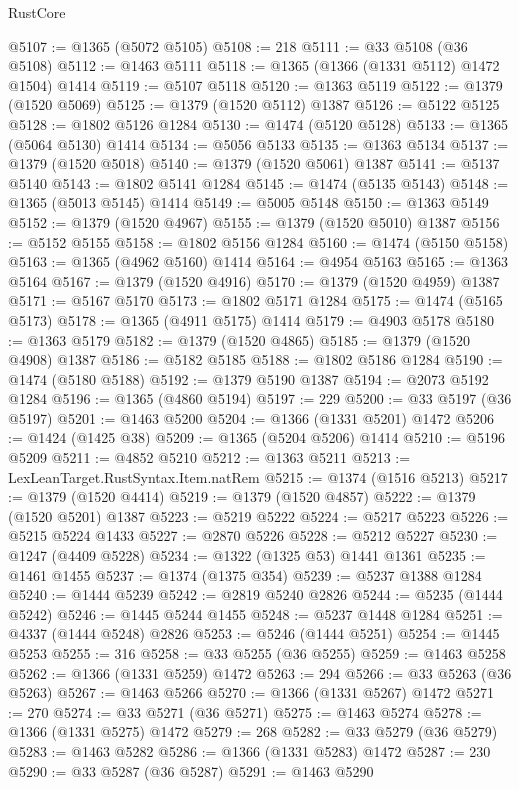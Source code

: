\begin{lexlean}{RustCore}
\begin{coremodule}
@5107 := @1365 (@5072 @5105)
@5108 := 218
@5111 := @33 @5108 (@36 @5108)
@5112 := @1463 @5111
@5118 := @1365 (@1366 (@1331 @5112) @1472 @1504) @1414
@5119 := @5107 @5118
@5120 := @1363 @5119
@5122 := @1379 (@1520 @5069)
@5125 := @1379 (@1520 @5112) @1387
@5126 := @5122 @5125
@5128 := @1802 @5126 @1284
@5130 := @1474 (@5120 @5128)
@5133 := @1365 (@5064 @5130) @1414
@5134 := @5056 @5133
@5135 := @1363 @5134
@5137 := @1379 (@1520 @5018)
@5140 := @1379 (@1520 @5061) @1387
@5141 := @5137 @5140
@5143 := @1802 @5141 @1284
@5145 := @1474 (@5135 @5143)
@5148 := @1365 (@5013 @5145) @1414
@5149 := @5005 @5148
@5150 := @1363 @5149
@5152 := @1379 (@1520 @4967)
@5155 := @1379 (@1520 @5010) @1387
@5156 := @5152 @5155
@5158 := @1802 @5156 @1284
@5160 := @1474 (@5150 @5158)
@5163 := @1365 (@4962 @5160) @1414
@5164 := @4954 @5163
@5165 := @1363 @5164
@5167 := @1379 (@1520 @4916)
@5170 := @1379 (@1520 @4959) @1387
@5171 := @5167 @5170
@5173 := @1802 @5171 @1284
@5175 := @1474 (@5165 @5173)
@5178 := @1365 (@4911 @5175) @1414
@5179 := @4903 @5178
@5180 := @1363 @5179
@5182 := @1379 (@1520 @4865)
@5185 := @1379 (@1520 @4908) @1387
@5186 := @5182 @5185
@5188 := @1802 @5186 @1284
@5190 := @1474 (@5180 @5188)
@5192 := @1379 @5190 @1387
@5194 := @2073 @5192 @1284
@5196 := @1365 (@4860 @5194)
@5197 := 229
@5200 := @33 @5197 (@36 @5197)
@5201 := @1463 @5200
@5204 := @1366 (@1331 @5201) @1472
@5206 := @1424 (@1425 @38)
@5209 := @1365 (@5204 @5206) @1414
@5210 := @5196 @5209
@5211 := @4852 @5210
@5212 := @1363 @5211
@5213 := LexLeanTarget.RustSyntax.Item.natRem
@5215 := @1374 (@1516 @5213)
@5217 := @1379 (@1520 @4414)
@5219 := @1379 (@1520 @4857)
@5222 := @1379 (@1520 @5201) @1387
@5223 := @5219 @5222
@5224 := @5217 @5223
@5226 := @5215 @5224 @1433
@5227 := @2870 @5226
@5228 := @5212 @5227
@5230 := @1247 (@4409 @5228)
@5234 := @1322 (@1325 @53) @1441 @1361
@5235 := @1461 @1455
@5237 := @1374 (@1375 @354)
@5239 := @5237 @1388 @1284
@5240 := @1444 @5239
@5242 := @2819 @5240 @2826
@5244 := @5235 (@1444 @5242)
@5246 := @1445 @5244 @1455
@5248 := @5237 @1448 @1284
@5251 := @4337 (@1444 @5248) @2826
@5253 := @5246 (@1444 @5251)
@5254 := @1445 @5253
@5255 := 316
@5258 := @33 @5255 (@36 @5255)
@5259 := @1463 @5258
@5262 := @1366 (@1331 @5259) @1472
@5263 := 294
@5266 := @33 @5263 (@36 @5263)
@5267 := @1463 @5266
@5270 := @1366 (@1331 @5267) @1472
@5271 := 270
@5274 := @33 @5271 (@36 @5271)
@5275 := @1463 @5274
@5278 := @1366 (@1331 @5275) @1472
@5279 := 268
@5282 := @33 @5279 (@36 @5279)
@5283 := @1463 @5282
@5286 := @1366 (@1331 @5283) @1472
@5287 := 230
@5290 := @33 @5287 (@36 @5287)
@5291 := @1463 @5290

\end{coremodule}
\end{lexlean}
